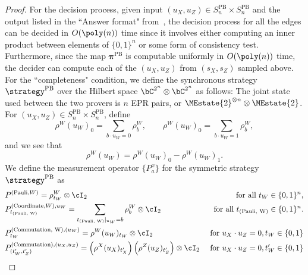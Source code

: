 \begin{proof}
	For the decision process, given input $(u_{X}, u_{Z}) \in  S^{\text{PB}}_n \times S^{\text{PB}}_n$ and the output listed in the ``Answer format" from~, the decision process for all the edges can be decided in $O(\poly(n))$ time since it involves either computing an inner product between elements of $\{0,1\}^n$ or some form of consistency test. Furthermore, since the map $\mathbf{\pi}^{\text{PB}}$ is computable uniformly in $O(\poly(n))$ time, the decider can compute each of the $(u_{X}, u_{Z})$ from $(s_{X}, s_{Z})$ sampled above. 
	For the ``completeness" condition, we define the synchronous strategy $\strategy^{\text{PB}}$ over the Hilbert space $\bC^{2^n} \otimes \bC^{2^n}$ as follows: The joint state used between the two provers is $n$ EPR pairs, or $\MEstate{2}^{\otimes n} \otimes \MEstate{2}$. For $(u_X, u_Z) \in S^{\text{PB}}_n \times S^{\text{PB}}_n$, define
	\begin{equation*}
		\rho^{W}(u_W)_0 = \sum_{b \cdot u_W = 0} \rho^{W}_b, \qquad  \rho^{W}(u_W)_0 = \sum_{b \cdot u_W = 1}\rho^{W}_b,
	\end{equation*}
	and we see that
	\begin{equation*}
			\rho^{W}(u_W) = \rho^{W}(u_W)_0  - 	\rho^{W}(u_W)_1. 
	\end{equation*}
	We define the measurement operator $\{P^x_a\}$ for the symmetric strategy $\strategy^{\text{PB}}$ as
	\begin{align*}
		&P^{(\text{Pauli}, W)} = \rho^{W}_{t_W} \otimes \cI_2 &\text{ for all } t_W \in \{0,1\}^n, \\
		&P^{(\text{Coordinate}, W), u_{W}}_{ t_{\text{(Pauli, W)}}} = \sum_{ t_{\text{(Pauli, W)}}|_{u_{W}} = b}  \rho^{W}_b \otimes \cI_2  &\text{ for all }  t_{\text{(Pauli, W)}} \in \{0,1\}^n. \\
		&P^{(\text{Commutation, W}), (u_W) }_{t_W} = \rho^{W}(u_W)_{t_W} \otimes \cI_2 &\text{ for }  u_X \cdot u_Z = 0, t_W \in \{0,1\}\\
		&P^{(\text{Commutation}), (u_X, u_Z) }_{(t_W', t_Z')} = \left(\rho^{X}(u_X)_{t_X'}\right)\left( \rho^{Z}(u_Z)_{t_Z'}\right) \otimes \cI_2&\text{ for }  u_X \cdot u_Z = 0, t_W' \in \{0,1\}\\

\end{align*}
\end{proof}
